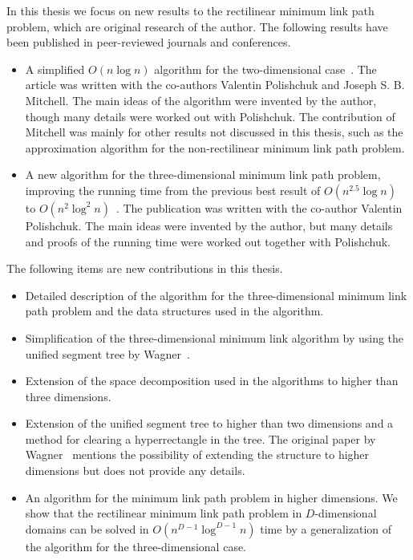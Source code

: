 \documentclass[english,gradu]{tktltiki2018}
\begin{document}
In this thesis we focus on new results to the rectilinear minimum link path problem, which are original research of the author.
The following results have been published in peer-reviewed journals and conferences.
\begin{itemize}
\item A simplified $O(n\log n)$ algorithm for the two-dimensional case~\cite{revisited}.
The article was written with the co-authors Valentin Polishchuk and Joseph S. B. Mitchell.
The main ideas of the algorithm were invented by the author, though many details were worked out with Polishchuk.
The contribution of Mitchell was mainly for other results not discussed in this thesis, such as the approximation algorithm for the non-rectilinear minimum link path problem.
\item A new algorithm for the three-dimensional minimum link path problem, improving the running time from the previous best result of $O(n^{2.5}\log n)$ to $O(n^2\log^2 n)$~\cite{restricted}.
The publication was written with the co-author Valentin Polishchuk.
The main ideas were invented by the author, but many details and proofs of the running time were worked out together with Polishchuk.
\end{itemize}

The following items are new contributions in this thesis.

\begin{itemize}
\item Detailed description of the algorithm for the three-dimensional minimum link path problem and the data structures used in the algorithm.
\item Simplification of the three-dimensional minimum link algorithm by using the unified segment tree by Wagner~\cite{unified}.
\item Extension of the space decomposition used in the algorithms to higher than three dimensions.
\item Extension of the unified segment tree to higher than two dimensions and a method for clearing a hyperrectangle in the tree.
	The original paper by Wagner~\cite{unified} mentions the possibility of extending the structure to higher dimensions but does not provide any details.
\item An algorithm for the minimum link path problem in higher dimensions.
	We show that the rectilinear minimum link path problem in $D$-dimensional domains can be solved in $O(n^{D-1}\log^{D-1} n)$ time by a generalization of the algorithm for the three-dimensional case.
\end{itemize}
\end{document}
